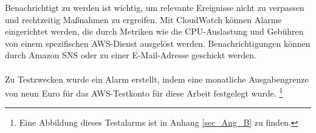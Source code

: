 Benachrichtigt zu werden ist wichtig, um relevante Ereignisse nicht zu verpassen und rechtzeitig Maßnahmen zu ergreifen. Mit CloudWatch können Alarme eingerichtet werden, die durch Metriken wie die CPU-Auslastung und Gebühren von einem spezifischen AWS-Dienst ausgelöst werden. Benachrichtigungen können durch Amazon SNS oder zu einer E-Mail-Adresse geschickt werden.
\\\\
Zu Testzwecken wurde ein Alarm erstellt, indem eine monatliche Ausgabengrenze von neun Euro für das AWS-Testkonto für diese Arbeit festgelegt wurde. \footnote{Eine Abbildung dieses Testalarms ist in Anhang \ref{sec_Ang_B} zu finden.}
